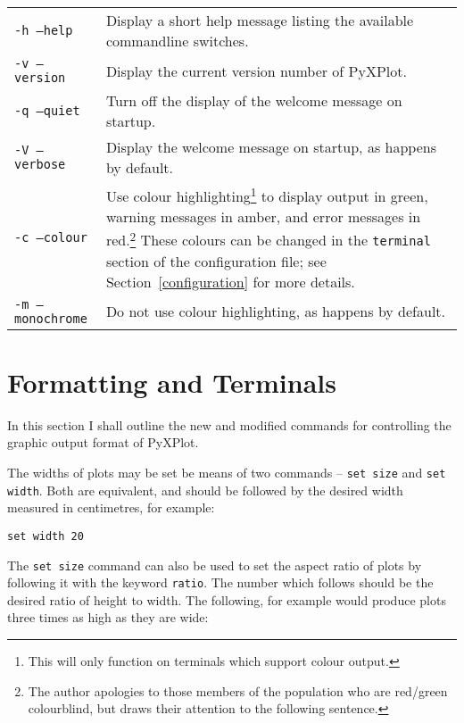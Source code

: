 \documentclass[a4paper,onecolumn,11pt]{book}
\begin{document}
\begin{longtable}{p{3.5cm}p{8.5cm}}
\texttt{-h --help} & Display a short help message listing the available commandline switches.\\
\texttt{-v --version} & Display the current version number of PyXPlot.\\
\texttt{-q --quiet} & Turn off the display of the welcome message on startup. \\
\texttt{-V --verbose} & Display the welcome message on startup, as happens by default. \\
\texttt{-c --colour} & Use colour highlighting\footnote{This will only function on terminals which support colour output.} to display output in green, warning messages in amber, and error messages in red.\footnote{The author apologies to those members of the population who are red/green colourblind, but draws their attention to the following sentence.} These colours can be changed in the \texttt{terminal} section of the configuration file; see Section~\ref{configuration} for more details. \\
\texttt{-m --monochrome} & Do not use colour highlighting, as happens by default. \\
\end{longtable}

\section{Formatting and Terminals}
\label{set_terminal2}

In this section I shall outline the new and modified commands for controlling
the graphic output format of PyXPlot.

The widths of plots may be set be means of two commands -- \texttt{set
size} and \texttt{set
width}. Both are
equivalent, and should be followed by the desired width measured in
centimetres, for example:

\begin{verbatim}
set width 20
\end{verbatim}

The \texttt{set size} command can also be used to set the aspect ratio of plots
by following it with the keyword \texttt{ratio}. The number which follows should be
the desired ratio of height to width. The following, for example would produce
plots three times as high as they are wide:
\end{document}
